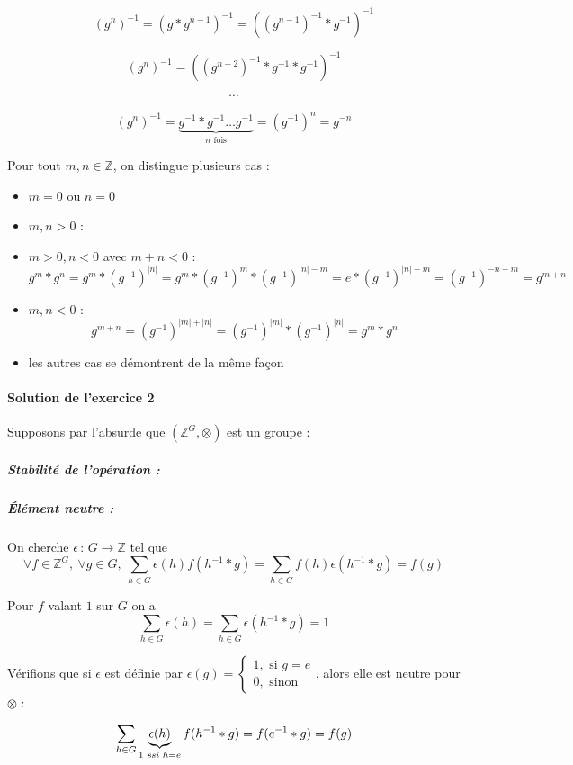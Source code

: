 \documentclass[]{article}
\theoremstyle{remark}
\theoremstyle{definition}
\newcommand{\funcshort}[3]{
#1 \, : \, #2 \longrightarrow #3
}
\begin{document}
$$\left( g^n \right)^{-1} = (g * g^{n-1})^{-1} = ((g^{n-1})^{-1}*g^{-1})^{-1}$$

$$\left( g^n \right)^{-1} = ((g^{n-2})^{-1}*g^{-1}*g^{-1})^{-1}$$

$$\cdots$$

$$\left( g^n \right)^{-1} = \underbrace{g^{-1}*g^{-1} \dots g^{-1}}_{n \text{ fois}} = (g^{-1})^n = g^{-n}$$

Pour tout $m, n \in \mathbb{Z}$, on distingue plusieurs cas :
\begin{itemize}
	\item $m = 0$ ou $n = 0$ \checkmark
	\item $m, n > 0$ : \checkmark
	\item $m > 0, n < 0$ avec $m + n < 0$ : $$g^m * g^n = g^m * \left(g^{-1}\right)^{|n|} = g^m*\left(g^{-1}\right)^m*\left(g^{-1}\right)^{|n| - m} = e * \left(g^{-1}\right)^{|n|-m}=\left(g^{-1}\right)^{-n-m}=g^{m+n}$$
	\item $m, n < 0$ : $$g^{m+n}=\left(g^{-1}\right)^{|m|+|n|}=\left(g^{-1}\right)^{|m|}*\left(g^{-1}\right)^{|n|}=g^m*g^n$$
	\item les autres cas se démontrent de la même façon
\end{itemize}

\paragraph{Solution de l'exercice 2}

Supposons par l'absurde que $\left(\mathbb{Z}^G, \otimes\right)$ est un groupe :

\subparagraph{Stabilité de l'opération :} \checkmark

\subparagraph{Élément neutre :} On cherche $\funcshort{\epsilon}{G}{\mathbb{Z}}$ tel que
$$\forall f \in \mathbb{Z}^G, ~ \forall g \in G, ~ \sum_{h \in G}\epsilon(h)f(h^{-1}*g)=\sum_{h \in G}f(h)\epsilon(h^{-1}*g)=f(g)$$

Pour $f$ valant $1$ sur $G$ on a
$$\sum_{h \in G}\epsilon(h)=\sum_{h \in G}\epsilon(h^{-1}*g)=1$$

Vérifions que si $\epsilon$ est définie par $\epsilon(g) = \left\{
\begin{array}{l}
	1, \text{ si } g = e \\
	0, \text{ sinon}
\end{array}
\right.$, alors elle est neutre pour $\otimes$ :

$$\sum_{h \in G}\underbrace{\epsilon(h)}_{1 \text{ \textit{ssi} } h = e}f(h^{-1}*g) = f(e^{-1}*g) = f(g)$$
\end{document}
